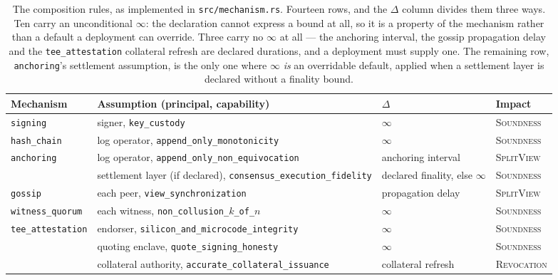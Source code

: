 \documentclass[11pt]{article}
\newcommand{\Never}{\infty}
\newcommand{\ub}{\_\allowbreak}
\begin{document}
\begin{table}[h]
\centering\footnotesize
\caption{The composition rules, as implemented in \texttt{src/mechanism.rs}.
Fourteen rows, and the $\Delta$ column divides them three ways. Ten carry an
unconditional $\Never$: the declaration cannot express a bound at all, so it
is a property of the mechanism rather than a default a deployment can
override. Three carry no $\Never$ at all --- the anchoring interval, the
gossip propagation delay and the \texttt{tee\ub attestation} collateral
refresh are declared durations, and a deployment must supply one. The
remaining row, \texttt{anchoring}'s settlement assumption, is the only one
where $\Never$ \emph{is} an overridable default, applied when a settlement
layer is declared without a finality bound.}
\label{tab:rules}
\setlength{\tabcolsep}{4pt}
\begin{tabular}{@{}p{2.4cm}>{\raggedright\arraybackslash}p{5.0cm}>{\raggedright\arraybackslash}p{3.0cm}p{2.3cm}@{}}
\toprule
\textbf{Mechanism} & \textbf{Assumption (principal, capability)} &
\textbf{$\Delta$} & \textbf{Impact} \\
\midrule
\texttt{signing} & signer, \texttt{key\ub custody} & $\Never$ &
\textsc{Soundness} \\
\addlinespace
\texttt{hash\ub chain} & log operator,
\texttt{append\ub only\ub monotonicity} & $\Never$ & \textsc{Soundness} \\
\addlinespace
\texttt{anchoring} & log operator,
\texttt{append\ub only\ub non\ub equivocation} & anchoring interval &
\textsc{SplitView} \\
 & settlement layer (if declared),
\texttt{consensus\ub execution\ub fidelity} & declared finality, else
$\Never$ & \textsc{Soundness} \\
\addlinespace
\texttt{gossip} & each peer, \texttt{view\ub synchronization} &
propagation delay & \textsc{SplitView} \\
\addlinespace
\texttt{witness\ub quorum} & each witness,
\texttt{non\ub collusion\ub $k$\ub of\ub $n$} & $\Never$ &
\textsc{Soundness} \\
\addlinespace
\texttt{tee\ub attestation} & endorser,
\texttt{silicon\ub and\ub microcode\ub integrity} & $\Never$ &
\textsc{Soundness} \\
 & quoting enclave, \texttt{quote\ub signing\ub honesty} & $\Never$ &
\textsc{Soundness} \\
 & collateral authority,
\texttt{accurate\ub collateral\ub issuance} & collateral refresh &
\textsc{Revocation} \\

\end{tabular}
\end{table}
\end{document}
